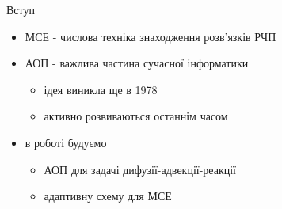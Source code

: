 
\begin{frame}{Вступ}
	\begin{itemize}
		\item МСЕ - числова техніка знаходження розв'язків РЧП
		\item АОП - важлива частина сучасної інформатики
			\begin{itemize}
				\item{ідея виникла ще в 1978 }
				\item активно розвиваються останнім часом \cite{ainsworth2011posteriori, eriksson1995introduction,verfurth1994posteriori,verfurth1996review}
			\end{itemize}
		\item в роботі будуємо
			\begin{itemize}
				\item АОП для задачі дифузії-адвекції-реакції
				\item адаптивну схему для МСЕ
			\end{itemize}
	\end{itemize}
\end{frame}
